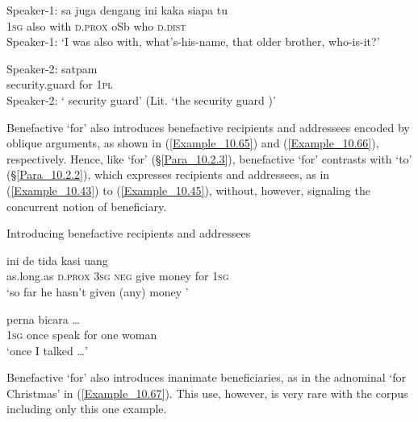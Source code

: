 \ea
\label{Example_10.64}
\ea
\label{Example_10.64a}
\gll Speaker-1:  sa  juga  dengang  ini  kaka  siapa  tu\\ %
   {}   \textsc{1sg}  also  with  \textsc{d.prox}  oSb  who  \textsc{d.dist}\\
\glt Speaker-1: ‘I was also with, what’s-his-name, that older brother, who-is-it?’
\vspace{5pt}

\ex
\label{Example_10.64b}
\gll    Speaker-2:  satpam    \\
 {}     security.guard  for  \textsc{1pl}\\
\glt Speaker-2: ‘ security guard’ (Lit. ‘the security guard )’ \textstyleExampleSource{[081025-006-Cv.0109]}
\z
\z



Benefactive  ‘for’ also introduces benefactive recipients and addressees encoded by oblique arguments, as shown in (\ref{Example_10.65}) and (\ref{Example_10.66}), respectively. Hence, like  ‘for’ (§\ref{Para_10.2.3}), benefactive  ‘for’ contrasts with   ‘to’ (§\ref{Para_10.2.2}), which expresses recipients and addressees, as in (\ref{Example_10.43}) to (\ref{Example_10.45}), without, however, signaling the concurrent notion of beneficiary.


\begin{styleExampleTitle}
Introducing benefactive recipients and addressees
\end{styleExampleTitle}

\ea
\label{Example_10.65}
 {ini} {de} {tida} {kasi} {uang} {} {}\\ %
 as.long.as  \textsc{d.prox}  \textsc{3sg}  \textsc{neg}  give  money  for  \textsc{1sg}\\
\glt 
‘so far he hasn’t given (any) money ’ \textstyleExampleSource{[081014-003-Cv.0034]}
\z

\ea
\label{Example_10.66}
 {perna} {bicara} {} {} { \ldots}\\ %
 \textsc{1sg}  once  speak  for  one  woman  \\
\glt 
‘once I talked  {\ldots}’ \textstyleExampleSource{[081011-024-Cv.0073]}
\z


Benefactive  ‘for’ also introduces inanimate beneficiaries, as in the adnominal   ‘for Christmas’ in (\ref{Example_10.67}). This use, however, is very rare with the corpus including only this one example.


